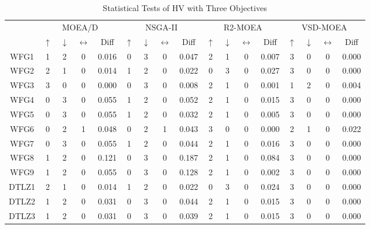 \begin{table*}[t]
\caption{Statistical Tests of HV with Three Objectives}
\label{tab:Tests_HV_3obj}
\centering
\begin{tabular}{c|c|c|c|c|c|c|c|c|c|c|c|c|c|c|c|c|}
\cline{2-17}
 & \multicolumn{4}{c|}{MOEA/D} & \multicolumn{4}{c|}{NSGA-II} & \multicolumn{4}{c|}{R2-MOEA} & \multicolumn{4}{c|}{VSD-MOEA} \\ \cline{2-17} 
 & $\uparrow$ & $\downarrow$ & $\leftrightarrow$ & Diff & $\uparrow$ & $\downarrow$ & $\leftrightarrow$ & Diff & $\uparrow$ & $\downarrow$ & $\leftrightarrow$ & Diff & $\uparrow$ & $\downarrow$ & $\leftrightarrow$ & Diff \\ \hline
\multicolumn{1}{|c|}{WFG1} & 1 & 2 & 0 & 0.016 & 0 & 3 & 0 & 0.047 & 2 & 1 & 0 & 0.007 & 3 & 0 & 0 & 0.000 \\ \hline
\multicolumn{1}{|c|}{WFG2} & 2 & 1 & 0 & 0.014 & 1 & 2 & 0 & 0.022 & 0 & 3 & 0 & 0.027 & 3 & 0 & 0 & 0.000 \\ \hline
\multicolumn{1}{|c|}{WFG3} & 3 & 0 & 0 & 0.000 & 0 & 3 & 0 & 0.008 & 2 & 1 & 0 & 0.001 & 1 & 2 & 0 & 0.004 \\ \hline
\multicolumn{1}{|c|}{WFG4} & 0 & 3 & 0 & 0.055 & 1 & 2 & 0 & 0.052 & 2 & 1 & 0 & 0.015 & 3 & 0 & 0 & 0.000 \\ \hline
\multicolumn{1}{|c|}{WFG5} & 0 & 3 & 0 & 0.055 & 1 & 2 & 0 & 0.032 & 2 & 1 & 0 & 0.005 & 3 & 0 & 0 & 0.000 \\ \hline
\multicolumn{1}{|c|}{WFG6} & 0 & 2 & 1 & 0.048 & 0 & 2 & 1 & 0.043 & 3 & 0 & 0 & 0.000 & 2 & 1 & 0 & 0.022 \\ \hline
\multicolumn{1}{|c|}{WFG7} & 0 & 3 & 0 & 0.055 & 1 & 2 & 0 & 0.044 & 2 & 1 & 0 & 0.016 & 3 & 0 & 0 & 0.000 \\ \hline
\multicolumn{1}{|c|}{WFG8} & 1 & 2 & 0 & 0.121 & 0 & 3 & 0 & 0.187 & 2 & 1 & 0 & 0.084 & 3 & 0 & 0 & 0.000 \\ \hline
\multicolumn{1}{|c|}{WFG9} & 1 & 2 & 0 & 0.055 & 0 & 3 & 0 & 0.128 & 2 & 1 & 0 & 0.002 & 3 & 0 & 0 & 0.000 \\ \hline
\multicolumn{1}{|c|}{DTLZ1} & 2 & 1 & 0 & 0.014 & 1 & 2 & 0 & 0.022 & 0 & 3 & 0 & 0.024 & 3 & 0 & 0 & 0.000 \\ \hline
\multicolumn{1}{|c|}{DTLZ2} & 1 & 2 & 0 & 0.031 & 0 & 3 & 0 & 0.044 & 2 & 1 & 0 & 0.015 & 3 & 0 & 0 & 0.000 \\ \hline
\multicolumn{1}{|c|}{DTLZ3} & 1 & 2 & 0 & 0.031 & 0 & 3 & 0 & 0.039 & 2 & 1 & 0 & 0.015 & 3 & 0 & 0 & 0.000 \\ \hline

\end{tabular}
\end{table*}
